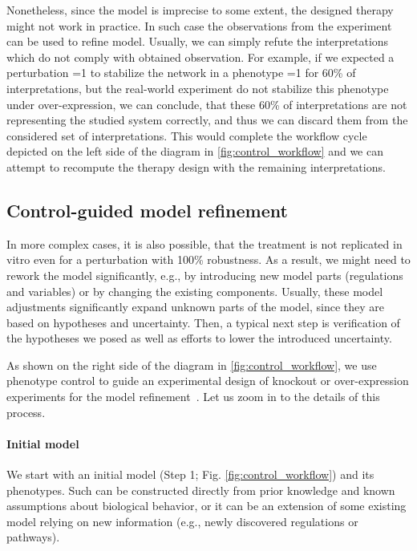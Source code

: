 Nonetheless, since the model is imprecise to some extent, the designed therapy might not work in practice. In such case the observations from the experiment can be used to refine \PBN{} model. Usually, we can simply refute the interpretations which do not comply with obtained observation. For example, if we expected a perturbation =1 to stabilize the network in a phenotype =1 for 60\% of interpretations, but the real-world experiment do not stabilize this phenotype under  over-expression, we can conclude, that these 60\% of interpretations are not representing the studied system correctly, and thus we can discard them from the considered set of interpretations. This would complete the workflow cycle depicted on the left side of the diagram in \autoref{fig:control_workflow} and we can attempt to recompute the therapy design with the remaining interpretations.

\subsection{Control-guided model refinement}

In more complex cases, it is also possible, that the treatment is not replicated in vitro even for a perturbation with 100\% robustness. As a result, we might need to rework the model significantly, e.g., by introducing new model parts (regulations and variables) or by changing the existing components. Usually, these model adjustments significantly expand unknown parts of the model, since they are based on hypotheses and uncertainty. Then, a typical next step is verification of the hypotheses we posed as well as efforts to lower the introduced uncertainty. 

As shown on the right side of the diagram in \autoref{fig:control_workflow}, we use phenotype control to guide an experimental design of knockout or over-expression experiments for the model refinement~\cite{UdDean2016}. Let us zoom in to the details of this process.

\paragraph{Initial \PBN{} model}
We start with an initial \PBN{} model (Step 1; Fig. \autoref{fig:control_workflow}) and its phenotypes. Such \PBN{} can be constructed directly from prior knowledge and known assumptions about biological behavior, or it can be an extension of some existing model relying on new information (e.g., newly discovered regulations or pathways).

